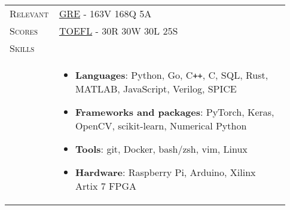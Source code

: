 \documentclass[letterpaper, 10pt, oneside]{article}
\newcommand{\stitle}[1]{\normalsize{\textsc{#1}}}
\newcommand{\bdit}[1]{{\textbf{#1}}}
\begin{document}
\begin{longtable}{@{} p{0.13\linewidth} p{0.8\linewidth}}
    \stitle{Relevant}    & \href{https://drive.google.com/file/d/1GcdXmPTWR-6tKUgB92V8pG8GVn-ng_6C}{GRE} \hspace{3mm} - 163V 168Q 5A                                                                                                         \\[0.3ex]
    \stitle{Scores}      & \href{https://drive.google.com/file/d/1lHDbt59e9o1LFKb_HhWiVbzITH7avB6j}{TOEFL} - 30R 30W 30L 25S                                                                                                                 \\

    \newpage
    \stitle{Skills}      &                                                                                                                                                                                                                   \\[-2.34ex]
                         & \parbox{0.8\textwidth}{                                                                                                                                                                                           %
        \begin{itemize}[leftmargin=0ex, itemsep=-0.4ex, topsep=-2ex, label={}]
            \item \bdit{Languages}:               Python, Go, C\texttt{++}, C, SQL, Rust, MATLAB, JavaScript, Verilog, SPICE
            \item \bdit{Frameworks and packages}: PyTorch, Keras, OpenCV, scikit-learn, Numerical Python
            \item \bdit{Tools}:                   git, Docker, bash/zsh, vim, Linux
            \item \bdit{Hardware}:                Raspberry Pi, Arduino, Xilinx Artix 7 FPGA
        \end{itemize}
    }
    \\
    \\[1ex]



\end{longtable}
\end{document}
